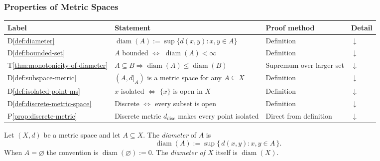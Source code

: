 \subsubsection{Properties of Metric Spaces}
\label{sec:properties-metric-spaces}

\begin{tcolorbox}[colback=gray!6, colframe=gray!40, arc=2pt,
  left=6pt, right=6pt, top=4pt, bottom=4pt,
  title={\small\textbf{Properties of Metric Spaces --- Quick Reference}},
  fonttitle=\small\bfseries]
\small
\begin{tabular}{l l l l}
\toprule
\textbf{Label} & \textbf{Statement} & \textbf{Proof method} & \textbf{Detail} \\
\midrule
D\ref{def:diameter}
  & $\operatorname{diam}(A) := \sup\{d(x,y):x,y\in A\}$
  & Definition
  & \hyperref[def:diameter]{$\downarrow$} \\
D\ref{def:bounded-set}
  & $A$ bounded $\iff$ $\operatorname{diam}(A) < \infty$
  & Definition
  & \hyperref[def:bounded-set]{$\downarrow$} \\
T\ref{thm:monotonicity-of-diameter}
  & $A \subseteq B \Rightarrow \operatorname{diam}(A) \le \operatorname{diam}(B)$
  & Supremum over larger set
  & \hyperref[thm:monotonicity-of-diameter]{$\downarrow$} \\
D\ref{def:subspace-metric}
  & $(A, d|_A)$ is a metric space for any $A \subseteq X$
  & Definition
  & \hyperref[def:subspace-metric]{$\downarrow$} \\
D\ref{def:isolated-point-ms}
  & $x$ isolated $\iff$ $\{x\}$ is open in $X$
  & Definition
  & \hyperref[def:isolated-point-ms]{$\downarrow$} \\
D\ref{def:discrete-metric-space}
  & Discrete $\iff$ every subset is open
  & Definition
  & \hyperref[def:discrete-metric-space]{$\downarrow$} \\
P\ref{prop:discrete-metric}
  & Discrete metric $d_{\mathrm{disc}}$ makes every point isolated
  & Direct from definition
  & \hyperref[prop:discrete-metric]{$\downarrow$} \\
\bottomrule
\end{tabular}
\end{tcolorbox}

\begin{tcolorbox}[colback=propbox, colframe=propborder, arc=2pt,
  left=6pt, right=6pt, top=4pt, bottom=4pt,
  title={\small\textbf{Definition (Diameter)}},
  fonttitle=\small\bfseries]
\begin{definition}[Diameter]
\label{def:diameter}
Let $(X,d)$ be a metric space and let $A \subseteq X$.
The \emph{diameter} of $A$ is
\[
\operatorname{diam}(A)
:=
\sup\{\, d(x,y) : x,y \in A \,\}.
\]
When $A = \varnothing$ the convention is $\operatorname{diam}(\varnothing) := 0$.
The \emph{diameter of $X$} itself is $\operatorname{diam}(X)$.
\end{definition}
\end{tcolorbox}

